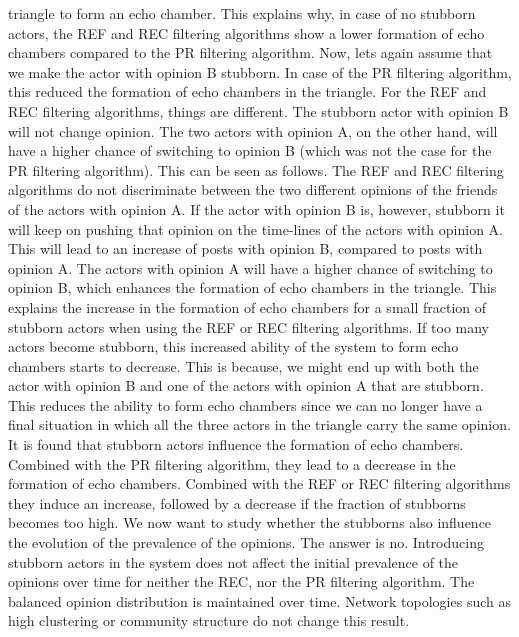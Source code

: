 \documentclass[11 pt , letterpaper , twoside , openright]{book}
\begin{document}
triangle to form an echo chamber. This explains why, in case of no stubborn actors, the REF and REC filtering algorithms show a lower formation of echo chambers compared to the PR filtering algorithm. Now, lets again assume that we make the actor with opinion B stubborn. In case of the PR filtering algorithm, this reduced the formation of echo chambers in the triangle. For the REF and REC filtering algorithms, things are different. The stubborn actor with opinion B will not change opinion. The two actors with opinion A, on the other hand, will have a higher chance of switching to opinion B (which was not the case for the PR filtering algorithm). This can be seen as follows. The REF and REC filtering algorithms do not discriminate between the two different opinions of the friends of the actors with opinion A. If the actor with opinion B is, however, stubborn it will keep on pushing that opinion on the time-lines of the actors with opinion A. This will lead to an increase of posts with opinion B, compared to posts with opinion A. The actors with opinion A will have a higher chance of switching to opinion B, which enhances the formation of echo chambers in the triangle. This explains the increase in the formation of echo chambers for a small fraction of stubborn actors when using the REF or REC filtering algorithms. If too many actors become stubborn, this increased ability of the system to form echo chambers starts to decrease. This is because, we might end up with both the actor with opinion B and one of the actors with opinion A that are stubborn. This reduces the ability to form echo chambers since we can no longer have a final situation in which all the three actors in the triangle carry the same opinion.\\
\newline
It is found that stubborn actors influence the formation of echo chambers. Combined with the PR filtering algorithm, they lead to a decrease in the formation of echo chambers. Combined with the REF or REC filtering algorithms they induce an increase, followed by a decrease if the fraction of stubborns becomes too high. We now want to study whether the stubborns also influence the evolution of the prevalence of the opinions. The answer is no. Introducing stubborn actors in the system does not affect the initial prevalence of the opinions over time for neither the REC, nor the PR filtering algorithm. The balanced opinion distribution is maintained over time. Network topologies such as high clustering or community structure do not change this result. \\
\end{document}
